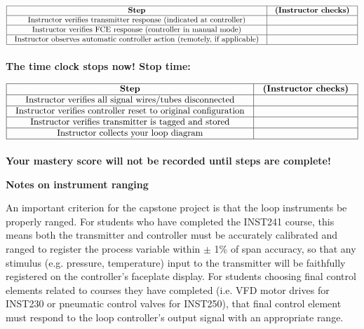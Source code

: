 $$\vbox{\offinterlineskip
\halign{\strut
\vrule \quad\hfil # \ \hfil & 
\vrule \quad\hfil # \ \hfil \vrule \cr
\noalign{\hrule}
%
{\bf Step} & {\bf (Instructor checks)} \cr
%
\noalign{\hrule}
%
Instructor verifies transmitter response (indicated at controller) &  \cr
%
\noalign{\hrule}
%
Instructor verifies FCE response (controller in manual mode) &  \cr
%
\noalign{\hrule}
%
Instructor observes automatic controller action (remotely, if applicable) &  \cr
%
\noalign{\hrule}
} %
}$$ %

\vskip 10pt

\centerline{\bf The time clock stops now! \hskip 50pt Stop time: \underbar{\hskip 80pt}}



$$\vbox{\offinterlineskip
\halign{\strut
\vrule \quad\hfil # \ \hfil & 
\vrule \quad\hfil # \ \hfil \vrule \cr
\noalign{\hrule}
%
{\bf Step} & {\bf (Instructor checks)} \cr
%
\noalign{\hrule}
%
Instructor verifies all signal wires/tubes disconnected &  \cr
%
\noalign{\hrule}
%
Instructor verifies controller reset to original configuration &  \cr
%
\noalign{\hrule}
%
Instructor verifies transmitter is tagged and stored &  \cr
%
\noalign{\hrule}
%
Instructor collects your loop diagram &  \cr
%
\noalign{\hrule}
} %
}$$ %

\vskip 10pt

\centerline{\bf Your mastery score will not be recorded until  steps are complete!}







\vfil \eject

\centerline{\bf Notes on instrument ranging}

\vskip 10pt

An important criterion for the capstone project is that the loop instruments be properly ranged.  For students who have completed the INST241 course, this means both the transmitter and controller must be accurately calibrated and ranged to register the process variable within $\pm$ 1\% of span accuracy, so that any stimulus (e.g. pressure, temperature) input to the transmitter will be faithfully registered on the controller's faceplate display.  For students choosing final control elements related to courses they have completed (i.e. VFD motor drives for INST230 or pneumatic control valves for INST250), that final control element must respond to the loop controller's output signal with an appropriate range.

